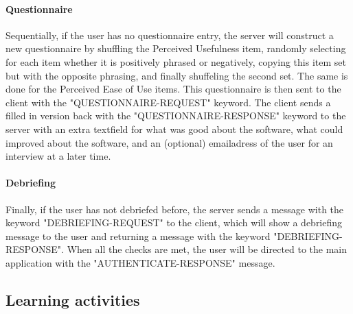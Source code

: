 \paragraph{Questionnaire} Sequentially, if the user has no questionnaire entry, the server will construct a new questionnaire by shuffling the Perceived Usefulness item, randomly selecting for each item whether it is positively phrased or negatively, copying this item set but with the opposite phrasing, and finally shuffeling the second set. The same is done for the Perceived Ease of Use items. This questionnaire is then sent to the client with the "QUESTIONNAIRE-REQUEST" keyword. The client sends a filled in version back with the "QUESTIONNAIRE-RESPONSE" keyword to the server with an extra textfield for what was good about the software, what could improved about the software, and an (optional) emailadress of the user for an interview at a later time.

\paragraph{Debriefing} Finally, if the user has not debriefed before, the server sends a message with the keyword "DEBRIEFING-REQUEST" to the client, which will show a debriefing message to the user and returning a message with the keyword "DEBRIEFING-RESPONSE". When all the checks are met, the user will be directed to the main application with the "AUTHENTICATE-RESPONSE" message.

\subsection{Learning activities}

